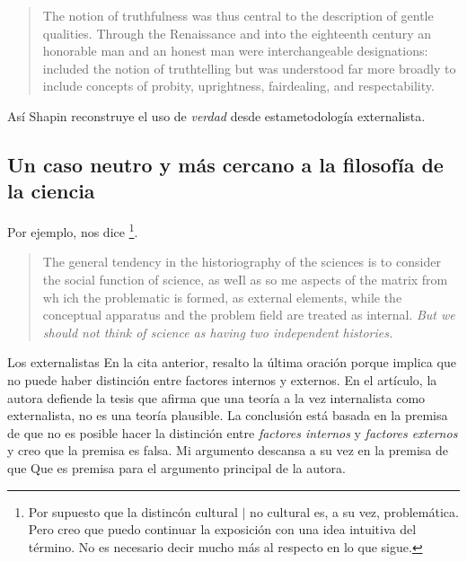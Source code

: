\begin{quote}
	The notion of truthfulness was thus central to the description of gentle qualities.
	Through the Renaissance and into the eighteenth century an honorable man and an honest man were interchangeable designations:  included the notion of truthtelling but was understood far more broadly to include concepts of probity, uprightness, fairdealing, and respectability. \parencite[][pp. 70-71]{Shapin1995}
\end{quote}

Así Shapin reconstruye el uso de \emph{verdad} desde estametodología externalista.

\subsection{Un caso neutro y más cercano a la filosofía de la ciencia}\label{sbc:yturbe}



Por ejemplo, nos dice \textcite{Yturbe1995}\footnote{
	Por supuesto que la distincón cultural $|$ no cultural es, a su vez, problemática.
	Pero creo que puedo continuar la exposición con una idea intuitiva del término.
	No es necesario decir mucho más al respecto en lo que sigue.
}.

\begin{quote}
	The general tendency in the historiography of the sciences is to consider the social function of science, as weIl as so me aspects of the matrix from wh ich the problematic is formed, as external elements, while the conceptual apparatus and the problem field are treated as internal. \emph{But we should not think of science as having two independent histories.} \parencite[][p. 85. Énfasis agregado]{Yturbe1995}
\end{quote}

Los externalistas
En la cita anterior, resalto la última oración porque implica que no puede haber distinción entre factores internos y externos.
En el artículo, la autora defiende la tesis que afirma que una teoría a la vez internalista como externalista, no es una teoría plausible.
La conclusión está basada en la premisa de que no es posible hacer la distinción entre \emph{factores internos} y \emph{factores externos} y
creo que la premisa es falsa.
Mi argumento descansa a su vez en la premisa de que 
Que es premisa para el argumento principal de la autora.



